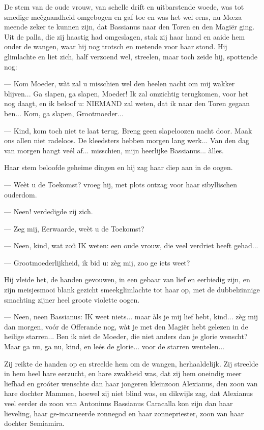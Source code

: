 \documentclass[a4paper, 12pt, oneside, dutch]{article}
\begin{document}
De stem van de oude vrouw, van schelle drift en uitbarstende woede, was tot smedige meêgaandheid omgebogen en gaf toe en was het wel eens, nu Mœza meende zeker te kunnen zijn, dat Bassianus naar den Toren en den Magiër ging. Uit de palla, die zij haastig had omgeslagen, stak zij haar hand en aaide hem onder de wangen, waar hij nog trotsch en metende voor haar stond. Hij glimlachte en liet zich, half verzoend wel, streelen, maar toch zeide hij, spottende nog:

--- Kom Moeder, wàt zal u misschien wel den heelen nacht om mij wakker blijven... Ga slapen, ga slapen, Moeder! Ik zal omzichtig terugkomen, voor het nog daagt, en ik beloof u: NIEMAND zal weten, dat ik naar den Toren gegaan ben... Kom, ga slapen, Grootmoeder...

--- Kind, kom toch niet te laat terug. Breng geen slapeloozen nacht door. Maak ons allen niet radeloos. De kleedsters hebben morgen lang werk... Van den dag van morgen hangt veél af... misschien, mijn heerlijke Bassianus... àlles.

Haar stem beloofde geheime dingen en hij zag haar diep aan in de oogen.

--- Weèt u de Toekomst? vroeg hij, met plots ontzag voor haar sibyllischen ouderdom.

--- Neen! verdedigde zij zich.

--- Zeg mij, Eerwaarde, weèt u de Toekomst?

--- Neen, kind, wat zoû IK weten: een oude vrouw, die veel verdriet heeft gehad...

--- Grootmoederlijkheid, ik bid u: zèg mij, zoo ge iets weet?

Hij vleide het, de handen gevouwen, in een gebaar van lief en eerbiedig zijn, en zijn meisjesmooi blank gezicht smeekglimlachte tot haar op, met de dubbelzinnige smachting zijner heel groote violette oogen.

--- Neen, neen Bassianus: IK weet niets... maar àls je mij lief hebt, kind... zèg mij dan morgen, voór de Offerande nog, wàt je met den Magiër hebt gelezen in de heilige starren... Ben ik niet de Moeder, die niet anders dan je glorie wenscht? Maar ga nu, ga nu, kind, en leés de glorie... voor de starren wentelen...

Zij reikte de handen op en streelde hem om de wangen, herhaaldelijk. Zij streelde in hem heel hare eerzucht, en hare zwakheid was, dat zij hem oneindig meer liefhad en groóter wenschte dan haar jongeren kleinzoon Alexianus, den zoon van hare dochter Mammea, hoewel zij niet blind was, en dikwijls zag, dat Alexianus veel eerder de zoon van Antoninus Bassianus Caracalla kon zijn dan haar lieveling, haar ge-incarneerde zonnegod en haar zonnepriester, zoon van haar dochter Semiamira.
\end{document}
